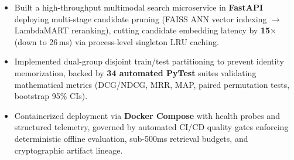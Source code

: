 
\begin{itemize}
    \item Built a high-throughput multimodal search microservice in \textbf{FastAPI} deploying multi-stage candidate pruning (FAISS ANN vector indexing $\rightarrow$ LambdaMART reranking), cutting candidate embedding latency by \textbf{15$\times$} (down to 26\,ms) via process-level singleton LRU caching.
    \item Implemented dual-group disjoint train/test partitioning to prevent identity memorization, backed by \textbf{34 automated PyTest} suites validating mathematical metrics (DCG/NDCG, MRR, MAP, paired permutation tests, bootstrap 95\% CIs).
    \item Containerized deployment via \textbf{Docker Compose} with health probes and structured telemetry, governed by automated CI/CD quality gates enforcing deterministic offline evaluation, sub-500ms retrieval budgets, and cryptographic artifact lineage.
\end{itemize}
\gap

